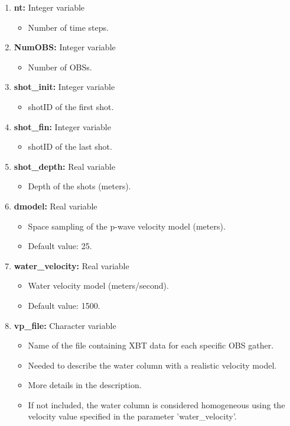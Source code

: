 \documentclass[11pt, oneside]{article}   	%
\begin{document}
\begin{enumerate}
\item \textbf{nt:} Integer variable
\begin{itemize}
\item Number of time steps.
\end{itemize}

\item \textbf{NumOBS:} Integer variable
\begin{itemize}
\item Number of OBSs.
\end{itemize}

\item \textbf{shot\_init:} Integer variable
\begin{itemize}
\item shotID of the first shot.
\end{itemize}

\item \textbf{shot\_fin:} Integer variable
\begin{itemize}
\item shotID of the last shot.
\end{itemize}

\item \textbf{shot\_depth:} Real variable
\begin{itemize}
\item Depth of the shots (meters).
\end{itemize}

\item \textbf{dmodel:} Real variable
\begin{itemize}
\item Space sampling of the p-wave velocity model (meters).
\item Default value: 25.
\end{itemize}

\item \textbf{water\_velocity:} Real variable
\begin{itemize}
\item Water velocity model (meters/second).
\item Default value: 1500.
\end{itemize}

\item \textbf{vp\_file:} Character variable
\begin{itemize}
\item Name of the file containing XBT data for each specific OBS gather.
\item Needed to describe the water column with a realistic velocity model.
\item More details in the description.
\item If not included, the water column is considered homogeneous using the velocity value specified in the parameter 'water\_velocity'.
\end{itemize}


\end{enumerate}
\end{document}
